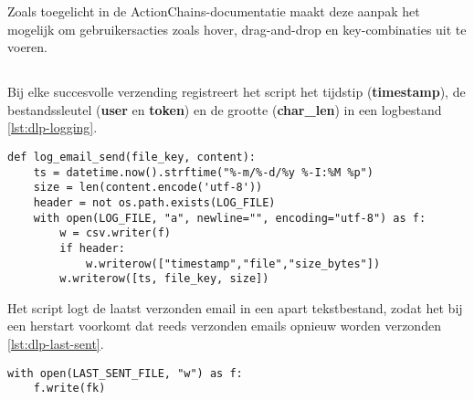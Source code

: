 Zoals toegelicht in de \textcite{Selenium2025ActionChains} ActionChains-documentatie maakt deze aanpak het mogelijk om gebruikersacties zoals hover, drag-and-drop en key-combinaties uit te voeren.

\subsection{}
\label{subsubsec:logging-herstartbaarheid}

Bij elke succesvolle verzending registreert het script het tijdstip (\textbf{timestamp}), 
de bestandssleutel (\textbf{user} en \textbf{token}) en de grootte (\textbf{char\_len}) in een logbestand \ref{lst:dlp-logging}.

\begin{lstlisting}[style=custompython,label={lst:dlp-logging}, caption={Logging van verzonden emails}, captionpos=b]
def log_email_send(file_key, content):
    ts = datetime.now().strftime("%-m/%-d/%y %-I:%M %p")
    size = len(content.encode('utf-8'))
    header = not os.path.exists(LOG_FILE)
    with open(LOG_FILE, "a", newline="", encoding="utf-8") as f:
        w = csv.writer(f)
        if header:
            w.writerow(["timestamp","file","size_bytes"])
        w.writerow([ts, file_key, size])
\end{lstlisting}

Het script logt de laatst verzonden email in een apart tekstbestand, zodat het bij een herstart voorkomt dat reeds verzonden emails opnieuw worden verzonden \ref{lst:dlp-last-sent}.

\begin{lstlisting}[style=custompython,label={lst:dlp-last-sent}, caption={Logging van verzonden emails}, captionpos=b]
with open(LAST_SENT_FILE, "w") as f:
    f.write(fk)
\end{lstlisting}

\section{}
\label{subsubsec:netskope-alerts}

